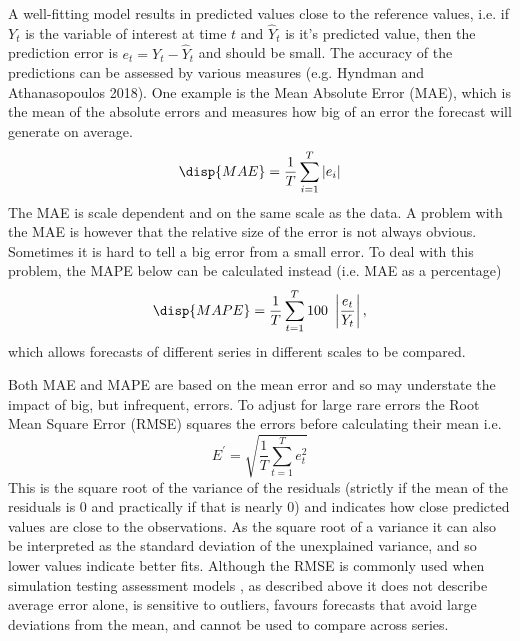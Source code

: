 A well-fitting model results in predicted values close to the reference values, i.e. if $Y_t$ is the variable of interest at time $t$ and ${\hat{Y}_t}$ is it's predicted value, then the prediction error is $e_t = Y_t - \hat{Y}_t$ and should be small. The accuracy of the predictions can be assessed by various measures (e.g. Hyndman and Athanasopoulos 2018). One example is the Mean Absolute Error (MAE), which is the mean of the absolute errors and measures how big of an error the forecast will generate on average.
\begin{equation} 
\disp {MAE} =\frac{1}{T} \sum_{i=1}^{T} \left| e_{i} \right|
\end{equation} 
The MAE is scale dependent and on the same scale as the data. A problem with the MAE is however that the relative size of the error is not always obvious. Sometimes it is hard to tell a big error from a small error. To deal with this problem, the MAPE below can be calculated instead (i.e. MAE as a percentage)
\begin{equation} 
\disp {MAPE} = \frac{1}{T} \sum_{t=1}^T 100 \ \left|\frac{e_t}{Y_t}\right|,
\end{equation}
which allows forecasts of different series in different scales to be compared.

Both MAE and MAPE are based on the mean error and so may understate the impact of big, but infrequent, errors. To adjust for large rare errors the Root Mean Square Error (RMSE) squares the errors before calculating their mean i.e.
\begin{equation}
E^{\prime} = \sqrt{\frac{1}{T} \sum_{t=1}^T e_t^2}
\end{equation}
This is the square root of the variance of the residuals (strictly if the mean of the residuals is 0 and practically if that is nearly 0) and indicates how close predicted values are close to the observations. As the square root of a variance it can also be interpreted as the standard deviation of the unexplained variance, and so lower values indicate better fits. Although the RMSE is commonly used when simulation testing assessment models \citep[e.g.][]{horbowy2011comparison}, as described above it does not describe average error alone, is sensitive to outliers, favours forecasts that avoid large deviations from the mean, and cannot be used to compare across series.

